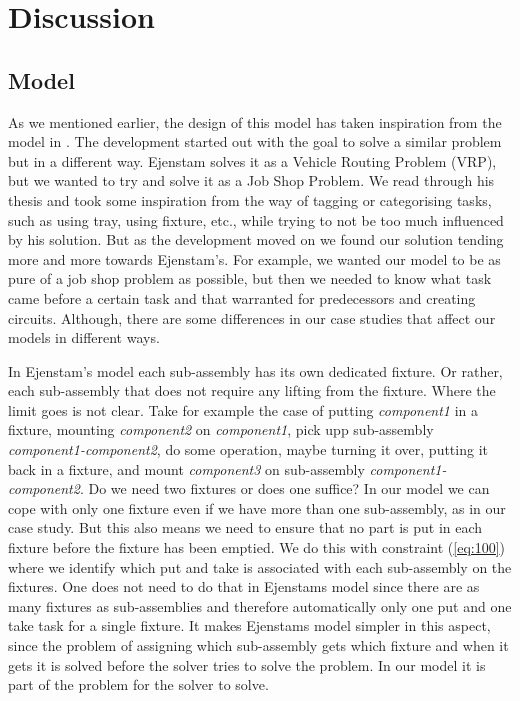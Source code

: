 \chapter{Discussion}\label{cha:discuss}

\section{Model}\label{sec:result_model}
As we mentioned earlier, the design of this model has taken inspiration from the model in \cite{ejenstam_2014}. The development started out with the goal to solve a similar problem but in a different way. Ejenstam solves it as a Vehicle Routing Problem (VRP), but we wanted to try and solve it as a Job Shop Problem. We read through his thesis and took some inspiration from the way of tagging or categorising tasks, such as using tray, using fixture, etc., while trying to not be too much influenced by his solution. But as the development moved on we found our solution tending more and more towards Ejenstam's. For example, we wanted our model to be as pure of a job shop problem as possible, but then we needed to know what task came before a certain task and that warranted for predecessors and creating circuits. Although, there are some differences in our case studies that affect our models in different ways.

In Ejenstam's model each sub-assembly has its own dedicated fixture. Or rather, each sub-assembly that does not require any lifting from the fixture. Where the limit goes is not clear. Take for example the case of putting \emph{component1} in a fixture, mounting \emph{component2} on \emph{component1}, pick upp sub-assembly \emph{component1-component2}, do some operation, maybe turning it over, putting it back in a fixture, and mount \emph{component3} on sub-assembly \emph{component1-component2}. Do we need two fixtures or does one suffice? In our model we can cope with only one fixture even if we have more than one sub-assembly, as in our case study. But this also means we need to ensure that no part is put in each fixture before the fixture has been emptied. We do this with constraint (\ref{eq:100}) where we identify which put and take is associated with each sub-assembly on the fixtures. One does not need to do that in Ejenstams model since there are as many fixtures as sub-assemblies and therefore automatically only one put and one take task for a single fixture. It makes Ejenstams model simpler in this aspect, since the problem of assigning which sub-assembly gets which fixture and when it gets it is solved before the solver tries to solve the problem. In our model it is part of the problem for the solver to solve.

